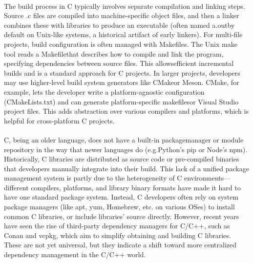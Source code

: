 \documentclass{article}
\begin{document}
\\
{\normalsize The build process in C t}{\normalsize ypically involves separate compilation and linking steps. Source .c files are compiled into machine-specific object files, and then a linker combines these with libraries to produce an executable (often named }{\normalsize a.out}{\normalsize  by default on Unix-like systems, a histor}{\normalsize ical artifact of early linkers). For multi-file projects, build configuration is often managed with }{\normalsize Makefiles}{\normalsize . The Unix make tool reads a }{\normalsize Makefile}{\normalsize  that describes how to compile and link the program, specifying dependencies between source files. This allows}{\normalsize  efficient incremental builds and is a standard approach for C projects. In larger projects, developers may use higher-level build system generators like }{\normalsize CMake}{\normalsize  or Meson. }{\normalsize CMake}{\normalsize , for example, lets the developer write a platform-agnostic configuration (CMakeL}{\normalsize ists.txt) and can generate platform-specific }{\normalsize makefiles}{\normalsize  or Visual Studio project files. This adds abstraction over various compilers and platforms, which is helpful for cross-platform C projects.}\\
\\
{\normalsize C, being an older language, does not have a built-in package}{\normalsize  manager or module repository in the way that newer languages do (}{\normalsize e.g.}{\normalsize  Python's pip or Node's }{\normalsize npm}{\normalsize ). Historically, C libraries are distributed as source code or pre-compiled binaries that developers manually integrate into their build. This lack of a unifie}{\normalsize d package management system is partly due to the heterogeneity of C environments—different compilers, platforms, and library binary }{\normalsize formats have made it hard to have one standard package system. Instead, C developers often rely on system package managers (}{\normalsize like apt, yum, Homebrew, etc. on various OSes) to install common C libraries, or include libraries' source directly. However, recent years have seen the rise of third-party dependency managers for C/C++, such as Conan and }{\normalsize vcpkg}{\normalsize , which aim to simplify obtai}{\normalsize ning and building C libraries. These are not yet universal, but they indicate a shift toward more centralized dependency management in the C/C++ world.}\\
\\
\end{document}
